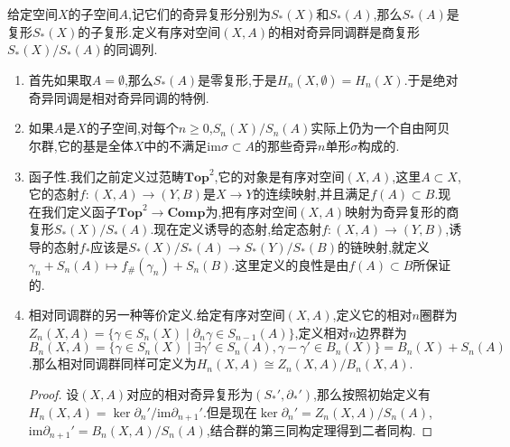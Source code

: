 给定空间$X$的子空间$A$,记它们的奇异复形分别为$S_*(X)$和$S_*(A)$,那么$S_*(A)$是复形$S_*(X)$的子复形.定义有序对空间$(X,A)$的相对奇异同调群是商复形$S_*(X)/S_*(A)$的同调列.
\begin{enumerate}
	\item 首先如果取$A=\emptyset$,那么$S_*(A)$是零复形,于是$H_n(X,\emptyset)=H_n(X)$.于是绝对奇异同调是相对奇异同调的特例.
	\item 如果$A$是$X$的子空间,对每个$n\ge0$,$S_n(X)/S_n(A)$实际上仍为一个自由阿贝尔群,它的基是全体$X$中的不满足$\mathrm{im}\sigma\subset A$的那些奇异$n$单形$\sigma$构成的.
	\item 函子性.我们之前定义过范畴$\textbf{Top}^2$,它的对象是有序对空间$(X,A)$,这里$A\subset X$,它的态射$f:(X,A)\to(Y,B)$是$X\to Y$的连续映射,并且满足$f(A)\subset B$.现在我们定义函子$\textbf{Top}^2\to\textbf{Comp}$为,把有序对空间$(X,A)$映射为奇异复形的商复形$S_*(X)/S_*(A)$.现在定义诱导的态射,给定态射$f:(X,A)\to(Y,B)$,诱导的态射$f_*$应该是$S_*(X)/S_*(A)\to S_*(Y)/S_*(B)$的链映射,就定义$\gamma_n+S_n(A)\mapsto f_{\#}(\gamma_n)+S_n(B)$.这里定义的良性是由$f(A)\subset B$所保证的.
	\item 相对同调群的另一种等价定义.给定有序对空间$(X,A)$,定义它的相对$n$圈群为$Z_n(X,A)=\{\gamma\in S_n(X)\mid \partial_n\gamma\in S_{n-1}(A)\}$,定义相对$n$边界群为$B_n(X,A)=\{\gamma\in S_n(X)\mid\exists\gamma'\in S_n(A),\gamma-\gamma'\in B_n(X)\}=B_n(X)+S_n(A)$.那么相对同调群同样可定义为$H_n(X,A)\cong Z_n(X,A)/B_n(X,A)$.
	\begin{proof}
		
		设$(X,A)$对应的相对奇异复形为$(S_*',\partial_*')$,那么按照初始定义有$H_n(X,A)=\ker\partial_n'/\mathrm{im}\partial_{n+1}'$.但是现在$\ker\partial_n'=Z_n(X,A)/S_n(A)$,$\mathrm{im}\partial_{n+1}'=B_n(X,A)/S_n(A)$,结合群的第三同构定理得到二者同构.
	\end{proof}
\end{enumerate}

